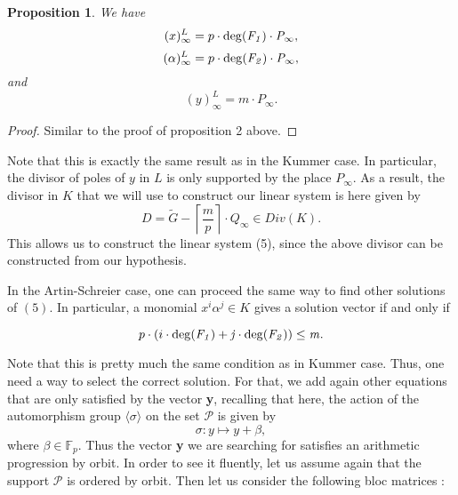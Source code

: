 \documentclass[10pt]{article}
\newtheorem{prop1}{Proposition}[]
\newcommand{\s}{\vspace{0.3cm}}
\newcommand{\cd}{\cdot}
\newcommand{\PR}{\mathcal{P}}
\begin{document}
\s

\begin{prop1}
We have
\[(x)^L_{\infty} = p \cd \rm{deg}\it(F_1) \cd P_{\infty},\]
\[(\alpha)^L_{\infty} = p \cd \rm{deg}\it(F_2) \cd P_{\infty},\]
and
\[(y)^L_{\infty} = m \cd P_{\infty}.\]
\end{prop1}

\s

\begin{proof}
Similar to the proof of proposition 2 above.
\end{proof}

\s

Note that this is exactly the same result as in the Kummer case. In particular, the divisor of poles of $y$ in $L$ is only supported by the place $P_{\infty}$. As a result, the divisor in $K$ that we will use to construct our linear system is here given by 
\[D = \tilde{G} - \left\lceil\frac{m}{p}\right\rceil \cd Q_{\infty} \in Div(K).\]
This allows us to construct the linear system (5), since the above divisor can be constructed from our hypothesis. 

\s

In the Artin-Schreier case, one can proceed the same way to find other solutions of $(5)$. In particular, a monomial $x^i\alpha^j \in K$ gives a solution vector if and only if 

\[p \cd (i \cd \rm{deg}\it(F_1)+j \cd \rm{deg}\it(F_2)) \leq m.\]

Note that this is pretty much the same condition as in Kummer case. Thus, one need a way to select the correct solution. For that, we add again other equations that are only satisfied by the vector \textbf{y}, recalling that here, the action of the automorphism group $\langle\sigma\rangle$ on the set $\PR$ is given by 
\[\sigma : y \longmapsto y + \beta,\]
where $\beta \in \mathbb{F}_p$. Thus the vector \textbf{y} we are searching for satisfies an arithmetic progression by orbit. In order to see it fluently, let us assume again that the support $\PR$ is ordered by orbit. Then let us consider the following bloc matrices :
\end{document}
